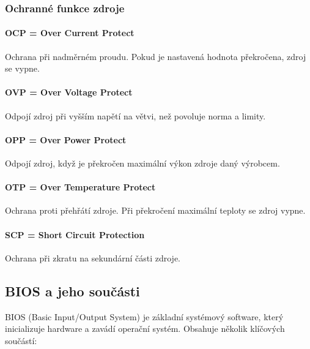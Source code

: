 \subsubsection{Ochranné funkce zdroje}
\paragraph{OCP = Over Current Protect}
Ochrana při nadměrném proudu. Pokud je nastavená hodnota překročena, zdroj se vypne.

\paragraph{OVP = Over Voltage Protect}
Odpojí zdroj při vyšším napětí na větvi, než povoluje norma a limity.

\paragraph{OPP = Over Power Protect}
Odpojí zdroj, když je překročen maximální výkon zdroje daný výrobcem.

\paragraph{OTP = Over Temperature Protect}
Ochrana proti přehřátí zdroje. Při překročení maximální teploty se zdroj vypne.

\paragraph{SCP = Short Circuit Protection}
Ochrana při zkratu na sekundární části zdroje.


\subsection{BIOS a jeho součásti}
BIOS (Basic Input/Output System) je základní systémový software, který inicializuje hardware a zavádí operační systém. Obsahuje několik klíčových součástí:

